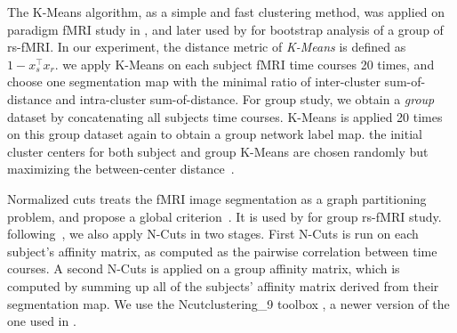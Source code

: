 \documentclass[final,authoryear,5p,twocolumn]{elsarticle}
\begin{document}
The K-Means algorithm, as a simple and fast clustering method, was applied on
paradigm fMRI study in \citet{baumgartner1998quantification}, and later used by
\cite{bellec2010multi} for bootstrap analysis of a group of rs-fMRI. In our
experiment, the distance metric of \emph{K-Means} is defined as $1 -
x_s^\intercal x_r$.  we apply \textsf{K-Means} on each subject fMRI time courses
20 times, and choose one segmentation map with the minimal ratio of
inter-cluster sum-of-distance and intra-cluster sum-of-distance. For group
study, we obtain a \emph{group} dataset by concatenating all subjects time
courses. \textsf{K-Means} is applied 20 times on this group dataset again to
obtain a group network label map. the initial cluster centers for both subject
and group \textsf{K-Means} are chosen randomly but maximizing the between-center
distance~\citep{arthur2007k}.

Normalized cuts treats the fMRI image segmentation as a graph partitioning
problem, and propose a global criterion~\cite{shi2000normalized}.  It is used by
\citet{van2008normalized, craddock2011whole} for group rs-fMRI
study. following~\citet{van2008normalized}, we also apply \textsf{N-Cuts} in two
stages. First \textsf{N-Cuts} is run on each subject's affinity matrix, as
computed as the pairwise correlation between time courses. A second N-Cuts is
applied on a group affinity matrix, which is computed by summing up all of the
subjects' affinity matrix derived from their segmentation map. We use the
\textsf{Ncutclustering\_9} toolbox \cite{shi2000normalized}, a newer version of
the one used in \cite{van2008normalized}.
\end{document}
